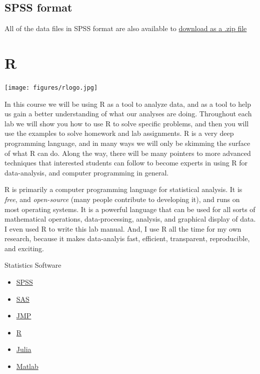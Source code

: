 \documentclass[
]{book}
\providecommand{\tightlist}{%
  \setlength{\itemsep}{0pt}\setlength{\parskip}{0pt}}
\begin{document}
\hypertarget{spss-format}{%
\subsection{SPSS format}\label{spss-format}}

All of the data files in SPSS format are also available to \href{https://raw.githubusercontent.com/CrumpLab/statisticsLab/master/data/spssdata/spss_data.zip}{download as a .zip file}

\hypertarget{r}{%
\section{R}\label{r}}

\texttt{[image: figures/rlogo.jpg]}

In this course we will be using R as a tool to analyze data, and as a tool to help us gain a better understanding of what our analyses are doing. Throughout each lab we will show you how to use R to solve specific problems, and then you will use the examples to solve homework and lab assignments. R is a very deep programming language, and in many ways we will only be skimming the surface of what R can do. Along the way, there will be many pointers to more advanced techniques that interested students can follow to become experts in using R for data-analysis, and computer programming in general.

R is primarily a computer programming language for statistical analysis. It is \emph{free}, and \emph{open-source} (many people contribute to developing it), and runs on most operating systems. It is a powerful language that can be used for all sorts of mathematical operations, data-processing, analysis, and graphical display of data. I even used R to write this lab manual. And, I use R all the time for my own research, because it makes data-analyis fast, efficient, transparent, reproducible, and exciting.

Statistics Software

\begin{itemize}
\tightlist
\item
  \href{http://www-01.ibm.com/software/analytics/spss/}{SPSS}
\item
  \href{http://www.sas.com/en_us/home.html}{SAS}
\item
  \href{http://www.jmp.com}{JMP}
\item
  \href{http://www.r-project.org}{R}
\item
  \href{http://julialang.org}{Julia}
\item
  \href{http://www.mathworks.com/products/matlab/}{Matlab}
\end{itemize}
\end{document}
